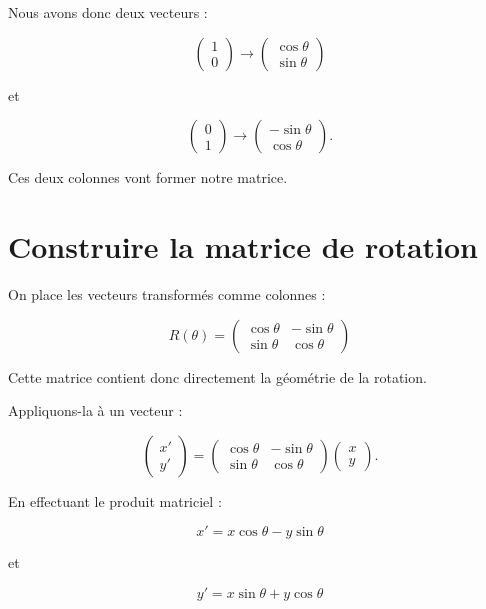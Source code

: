 \documentclass[11pt,a4paper]{article}
\newcommand{\sectiontitle}[1]{
    \section{#1}
}
\begin{document}
Nous avons donc deux vecteurs :

\[
\begin{pmatrix}
1\\
0
\end{pmatrix}
\longrightarrow
\begin{pmatrix}
\cos\theta\\
\sin\theta
\end{pmatrix}
\]

et

\[
\begin{pmatrix}
0\\
1
\end{pmatrix}
\longrightarrow
\begin{pmatrix}
-\sin\theta\\
\cos\theta
\end{pmatrix}.
\]

Ces deux colonnes vont former notre matrice.


\sectiontitle{Construire la matrice de rotation}

On place les vecteurs transformés comme colonnes :

\[
\boxed{
R(\theta)=
\begin{pmatrix}
\cos\theta & -\sin\theta\\
\sin\theta & \cos\theta
\end{pmatrix}
}
\]

Cette matrice contient donc directement la géométrie de la rotation.

Appliquons-la à un vecteur :

\[
\begin{pmatrix}
x'\\
y'
\end{pmatrix}
=
\begin{pmatrix}
\cos\theta & -\sin\theta\\
\sin\theta & \cos\theta
\end{pmatrix}
\begin{pmatrix}
x\\
y
\end{pmatrix}.
\]

En effectuant le produit matriciel :

\[
\boxed{
x'=x\cos\theta-y\sin\theta
}
\]

et

\[
\boxed{
y'=x\sin\theta+y\cos\theta
}
\]
\end{document}
